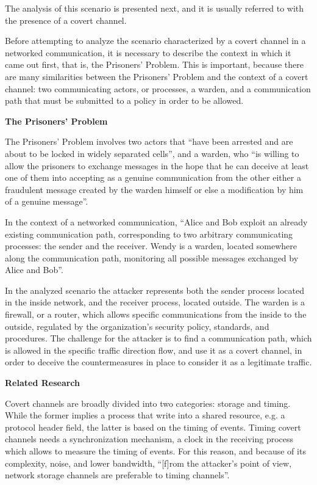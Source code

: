 \documentclass[12pt]{article}
\begin{document}
The analysis of this scenario is presented next, and it is usually referred to with the presence of a covert channel.

Before attempting to analyze the scenario characterized by a covert channel in a networked communication, it is necessary to describe the context in which it came out first, that is, the Prisoners' Problem. This is important, because there are many similarities between the Prisoners' Problem and the context of a covert channel: two communicating actors, or processes, a warden, and a communication path that must be submitted to a policy in order to be allowed.

\textbf{The Prisoners' Problem}
\label{subsub:prisoners}

The Prisoners' Problem involves two actors that ``have been arrested and are about to be locked in widely separated cells'', and a warden, who ``is willing to allow the prisoners to exchange messages in the hope that he can deceive at least one of them into accepting as a genuine communication from the other either a fraudulent message created by the warden himself or else a modification by him of a genuine message''\cite{prisoners}.

In the context of a networked communication, ``Alice and Bob exploit an already existing communication path, corresponding to two arbitrary communicating processes: the sender and the receiver. Wendy is a warden, located somewhere along the communication path, monitoring all possible messages exchanged by Alice and Bob''\cite{lewandowski}.

In the analyzed scenario the attacker represents both the sender process located in the inside network, and the receiver process, located outside. The warden is a firewall, or a router, which allows specific communications from the inside to the outside, regulated by the organization's security policy, standards, and procedures. The challenge for the attacker is to find a communication path, which is allowed in the specific traffic direction flow, and use it as a covert channel, in order to deceive the countermeasures in place to consider it as a legitimate traffic.

\textbf{Related Research}

Covert channels are broadly divided into two categories: storage and timing. While the former implies a process that write into a shared resource, e.g. a protocol header field, the latter is based on the timing of events. Timing covert channels needs a synchronization mechanism, a clock in the receiving process which allows to measure the timing of events. For this reason, and because of its complexity, noise, and lower bandwidth, ``[f]rom the attacker's point of view, network storage channels are preferable to timing channels''\cite{milevaPanajotov}. 
\end{document}

